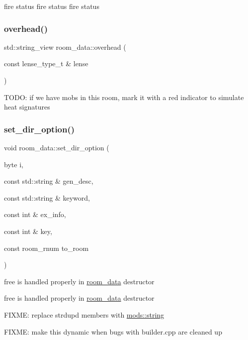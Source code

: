 fire status fire status fire status \mbox{\label{structroom__data_a2884a2a31feeab08c7e495453e354261}} 
\subsubsection{\texorpdfstring{overhead()}{overhead()}}
{\footnotesize\ttfamily std\+::string\+\_\+view room\+\_\+data\+::overhead (\begin{DoxyParamCaption}\item[{const lense\+\_\+type\+\_\+t \&}]{lense }\end{DoxyParamCaption})}

T\+O\+DO\+: if we have mobs in this room, mark it with a red indicator to simulate heat signatures \mbox{\label{structroom__data_a34bca78611d71d3aaffa3c3353bd14f9}} 
\subsubsection{\texorpdfstring{set\+\_\+dir\+\_\+option()}{set\_dir\_option()}}
{\footnotesize\ttfamily void room\+\_\+data\+::set\+\_\+dir\+\_\+option (\begin{DoxyParamCaption}\item[{byte}]{i,  }\item[{const std\+::string \&}]{gen\+\_\+desc,  }\item[{const std\+::string \&}]{keyword,  }\item[{const int \&}]{ex\+\_\+info,  }\item[{const int \&}]{key,  }\item[{const room\+\_\+rnum}]{to\+\_\+room }\end{DoxyParamCaption})}

free is handled properly in \hyperlink{structroom__data}{room\+\_\+data} destructor

free is handled properly in \hyperlink{structroom__data}{room\+\_\+data} destructor

F\+I\+X\+ME\+: replace strdup\textquotesingle{}d members with \hyperlink{structmods_1_1string}{mods\+::string}

F\+I\+X\+ME\+: make this dynamic when bugs with builder.\+cpp are cleaned up \mbox{\label{structroom__data_aae0acfa6fdd06020915943202f3826c2}} 

